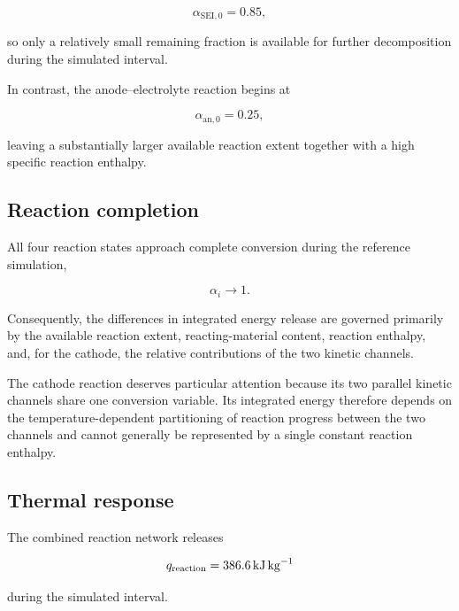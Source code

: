 \begin{equation}
    \alpha_{\mathrm{SEI},0}
    =
    0.85,
\end{equation}

so only a relatively small remaining fraction is available for further
decomposition during the simulated interval.

In contrast, the anode--electrolyte reaction begins at

\begin{equation}
    \alpha_{\mathrm{an},0}
    =
    0.25,
\end{equation}

leaving a substantially larger available reaction extent together with
a high specific reaction enthalpy.


\subsection{Reaction completion}

All four reaction states approach complete conversion during the
reference simulation,

\begin{equation}
    \alpha_i
    \rightarrow
    1.
\end{equation}

Consequently, the differences in integrated energy release are governed
primarily by the available reaction extent, reacting-material content,
reaction enthalpy, and, for the cathode, the relative contributions of
the two kinetic channels.

The cathode reaction deserves particular attention because its two
parallel kinetic channels share one conversion variable. Its integrated
energy therefore depends on the temperature-dependent partitioning of
reaction progress between the two channels and cannot generally be
represented by a single constant reaction enthalpy.


\subsection{Thermal response}

The combined reaction network releases

\begin{equation}
    q_{\mathrm{reaction}}
    =
    \SI{386.6}{\kilo\joule\per\kilogram}
\end{equation}

during the simulated interval.

